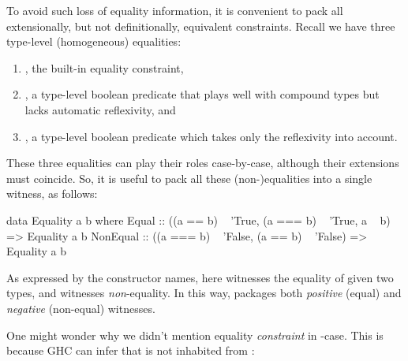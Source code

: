 \documentclass[demotion-paper.tex]{subfiles}
\begin{document}
To avoid such loss of equality information, it is convenient to pack all extensionally, but not definitionally, equivalent constraints.
Recall we have three type-level (homogeneous) equalities:
\begin{enumerate}
\item {}, the built-in equality constraint,
\item {}, a type-level boolean predicate that plays well with compound types but lacks automatic reflexivity, and
\item {}, a type-level boolean predicate which takes only the reflexivity into account.
\end{enumerate}
These three equalities can play their roles case-by-case, although their extensions must coincide.
So, it is useful to pack all these (non-)equalities into a single witness, as follows:
\begin{code}
data Equality a b where
  Equal :: 
    ((a == b) ~ 'True, 
     (a === b) ~ 'True, a ~ b) => Equality a b
  NonEqual
    :: ((a === b) ~ 'False, 
        (a == b) ~ 'False) => Equality a b
\end{code}
As expressed by the constructor names, here  witnesses the equality of given two types, and  witnesses \emph{non}-equality.
In this way,  packages both \emph{positive} (equal) and \emph{negative} (non-equal) witnesses.

One might wonder why we didn't mention equality \emph{constraint}  in -case.
This is because GHC can infer that  is not inhabited from :
\end{document}
